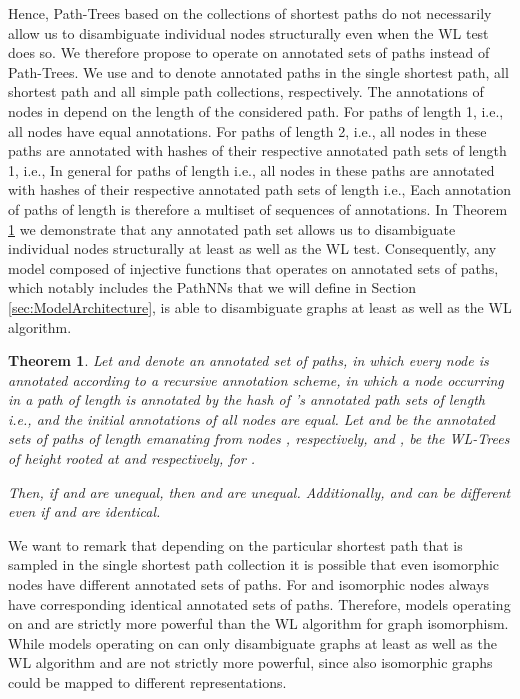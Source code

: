 \documentclass{article}
\theoremstyle{plain}
\newtheorem{theorem}{Theorem}[section]
\theoremstyle{definition}
\theoremstyle{remark}
\begin{document}
Hence, Path-Trees based on the collections of shortest paths do not necessarily allow us to disambiguate individual nodes structurally even when the WL test does so. We therefore propose to operate on annotated sets of paths instead of Path-Trees. We use  and  to denote annotated paths in the single shortest path, all shortest path and all simple path collections, respectively. The annotations of nodes in  depend on the length of the considered path. For paths of length 1, i.e.,  all nodes have equal annotations. For paths of length 2, i.e.,  all nodes  in these paths are annotated with hashes of their respective annotated path sets of length 1, i.e.,  In general for paths of length  i.e.,  all nodes  in these paths are annotated with hashes of their respective annotated path sets of length  i.e.,  Each annotation of paths of length  is therefore a multiset of sequences of annotations. In Theorem \ref{thm:ExpressivityOfAnnotatedSetsOfPaths} we demonstrate that any annotated path set  allows us to disambiguate individual nodes structurally at least as well as the WL test. Consequently, any model composed of injective functions that operates on annotated sets of paths, which notably includes the PathNNs that we will define in Section \ref{sec:ModelArchitecture}, is able to disambiguate graphs at least as well as the WL algorithm.  



\begin{theorem} \label{thm:ExpressivityOfAnnotatedSetsOfPaths}
Let  and  denote an annotated set of paths, in which every node is annotated according to a recursive annotation scheme, in which a node  occurring in a path of length  is annotated by the hash of 's annotated path sets of length  i.e.,  and the initial annotations of all nodes are equal. Let  and  be the annotated sets of paths of length  emanating from nodes , respectively, and ,  be the WL-Trees of height  rooted at  and  respectively, for . 

Then, if  and  are unequal, then  and  are unequal.
Additionally,  and  can be different even if  and  are identical.
\end{theorem}

We want to remark that depending on the particular shortest path that is sampled in the single shortest path collection  it is possible that even isomorphic nodes have different annotated sets of paths. For  and  isomorphic nodes always have corresponding identical annotated sets of paths. Therefore, models operating on  and  are strictly more powerful than the WL algorithm for graph isomorphism. While models operating on  can only disambiguate graphs at least as well as the WL algorithm and are not strictly more powerful, since also isomorphic graphs could be mapped to different representations. 
\end{document}
